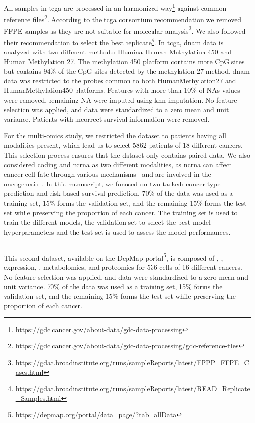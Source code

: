 \documentclass[../main.tex]{subfiles}
\begin{document}
	 All samples in \gls{tcga} are processed in an harmonized way\footnote{\url{https://gdc.cancer.gov/about-data/gdc-data-processing}} against common reference files\footnote{\url{https://gdc.cancer.gov/about-data/gdc-data-processing/gdc-reference-files}}.
	 According to the \gls{tcga} consortium recommendation we removed FFPE samples as they are not suitable for molecular analysis\footnote{\href{https://web.archive.org/web/20150919082952/https://gdac.broadinstitute.org/runs/sampleReports/latest/FPPP_FFPE_Cases.html}{https://gdac.broadinstitute.org/runs/sampleReports/latest/FPPP\_FFPE\_Cases.html}}.
	 We also followed their recommendation to select the best replicate\footnote{\href{https://web.archive.org/web/20150919044554/http://gdac.broadinstitute.org/runs/sampleReports/latest/READ_Replicate_Samples.html}{https://gdac.broadinstitute.org/runs/sampleReports/latest/READ\_Replicate\_Samples.html}}.
	 In \gls{tcga}, \gls{dnam} data is analyzed with two different methods: Illumina Human Methylation 450 and Human Methylation 27.
	 The methylation 450 platform contains more CpG sites but contains 94\% of the CpG sites detected by the methylation 27 method.
	 \Gls{dnam} data was restricted to the probes common to both HumanMethylation27 and HumanMethylation450 platforms.
	 Features with more than 10\% of NAs values were removed, remaining NA were imputed using \gls{knn} imputation.
	 No feature selection was applied, and data were standardized to a zero mean and unit variance.
	 Patients with incorrect survival information were removed.

	 For the multi-omics study, we restricted the dataset to patients having all modalities present, which lead us to select 5862 patients of 18 different cancers.
	 This selection process ensures that the dataset only contains paired data.
	 We also considered coding and \gls{ncrna} as two different modalities, as \gls{ncrna} can affect cancer cell fate through various mechanisms~\cite{Grillone2020} and are involved in the oncogenesis~\cite{Toden2021}.
	 In this manuscript, we focused on two tasked: cancer type prediction and risk-based survival prediction.
	 70\% of the data was used as a training set, 15\% forms the validation set, and the remaining 15\% forms the test set while preserving the proportion of each cancer.
	 The training set is used to train the different models, the validation set to select the best model hyperparameters and the test set is used to assess the model performances.

 \subsection{}
	 This second dataset, available on the DepMap portal\footnote{\url{https://depmap.org/portal/data_page/?tab=allData}}, is composed of , ,  expression, , metabolomics, and proteomics for 536 cells of 16 different cancers.
	 No feature selection was applied, and data were standardized to a zero mean and unit variance.
	 70\% of the data was used as a training set, 15\% forms the validation set, and the remaining 15\% forms the test set while preserving the proportion of each cancer.
\end{document}
